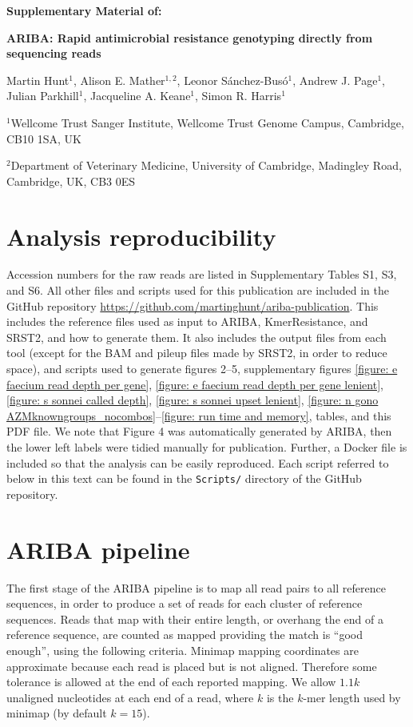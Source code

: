 \documentclass[11pt, a4paper]{article}
\begin{document}
\makeatletter
\renewcommand{\thefigure}{S\@arabic\c@figure}
\renewcommand{\thetable}{S\@arabic\c@table}
\makeatother
\thispagestyle{empty}
{\noindent\bf Supplementary Material of: \vspace{2em}}

{\noindent\bf ARIBA: Rapid antimicrobial resistance genotyping directly from sequencing reads\vspace{2em}}


\noindent Martin Hunt$^{1}$,
Alison E. Mather$^{1,2}$,
Leonor S\'{a}nchez-Bus\'{o}$^{1}$,
Andrew J. Page$^{1}$,
Julian Parkhill$^{1}$,
Jacqueline A. Keane$^{1}$,
Simon R. Harris$^{1}$\vspace{2em}

\noindent$^{1}$Wellcome Trust Sanger Institute, Wellcome Trust Genome Campus, Cambridge, CB10 1SA, UK


\noindent$^{2}$Department of Veterinary Medicine, University of Cambridge, Madingley Road, Cambridge, UK, CB3 0ES


\newpage
\setcounter{tocdepth}{1}
\tableofcontents
\newpage


\section{Analysis reproducibility}
Accession numbers for the raw reads are listed in
Supplementary Tables S1, S3, and S6.
All other files and scripts used for this publication
are included in the GitHub repository
\url{https://github.com/martinghunt/ariba-publication}.
This includes the reference files used as input to ARIBA,
KmerResistance, and SRST2, and how to generate them. It also
includes the output files from each tool (except for the BAM
and pileup files made by SRST2, in order to reduce space), and scripts
used to generate figures 2--5, supplementary figures
\ref{figure: e faecium read depth per gene},
\ref{figure: e faecium read depth per gene lenient},
\ref{figure: s sonnei called depth},
\ref{figure: s sonnei upset lenient},
\ref{figure: n gono AZMknowngroups_nocombos}--\ref{figure: run time and memory},
tables, and this
PDF file. We note that Figure 4 was automatically
generated by ARIBA, then the lower left labels
were tidied manually for publication. Further, a Docker
file is included so that the analysis can be easily reproduced.
Each script referred to below in this text can be found
in the \texttt{Scripts/} directory of the GitHub repository.


\section{ARIBA pipeline}
The first stage of the ARIBA pipeline is to map all read pairs to all reference
sequences, in order to produce a set of reads for each cluster of reference
sequences. Reads that map with their entire length, or overhang the end of a
reference sequence, are counted as mapped providing the match is ``good enough'',
using the following criteria. Minimap mapping coordinates are approximate
because each read is placed but is not aligned. Therefore some tolerance is allowed
at the end of each reported mapping. We allow $1.1k$ unaligned nucleotides at each
end of a read, where $k$ is the $k$-mer length used by minimap (by default
$k=15$).
\end{document}
